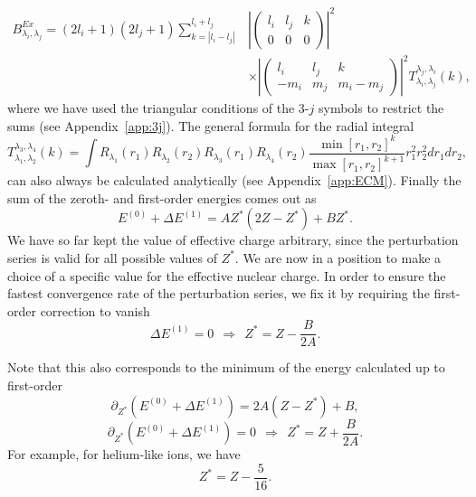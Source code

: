 \begin{align}
    B^{Ex}_{\lambda_i,\lambda_j} = (2l_i+1)(2l_j+1)\sum_{k=|l_i-l_j|}^{l_i+l_j}&
    \left| \begin{pmatrix} l_i & l_j & k \\ 0 & 0 & 0\end{pmatrix}\right|^2 \nonumber
\\& \times
    \left|\begin{pmatrix} l_i & l_j & k \\ -m_i & m_j & m_i-m_j \end{pmatrix}\right|^2
T^{\lambda_j,\lambda_i}_{\lambda_i,\lambda_j}(k),
\end{align}
where we have used the triangular conditions of the 3-$j$ symbols to restrict the sums (see Appendix~\ref{app:3j}). The general formula for the radial integral
\begin{equation}
    T^{\lambda_3,\lambda_4}_{\lambda_1,\lambda_2}(k) = \int R_{\lambda_1}(r_1) R_{\lambda_2}(r_2) R_{\lambda_3}(r_1) R_{\lambda_4}(r_2) \frac{\min[r_1,r_2]^k}{\max[r_1,r_2]^{k+1}} r_1^2 r_2^2 dr_1 dr_2,
\end{equation}
can also always be calculated analytically (see Appendix~\ref{app:ECM}).
Finally the sum of the zeroth- and first-order energies comes out as
\begin{equation} \label{Z-Z}
E^{(0)} + \Delta E^{(1)} = A Z^*(2Z-Z^*)+B Z^*.
\end{equation}
We have so far kept the value of effective charge arbitrary, since the perturbation series is valid for all possible values of $Z^*$. We are now in a position to make a choice of a specific value for the effective nuclear charge. In order to ensure the fastest convergence rate of the perturbation series, we fix it by
requiring the first-order correction to vanish
\begin{equation} \label{Z-Z}
\Delta E^{(1)} = 0 ~~\Rightarrow~~Z^* = Z - \frac{B}{2A} .
\end{equation}

Note that this also corresponds to the minimum of the energy calculated up to first-order
\begin{equation} \label{Z-Z}
\partial_{Z^*} (E^{(0)} + \Delta E^{(1)}) = 2A(Z-Z^*)+B,
\end{equation}
\begin{equation} \label{Z-Z}
\partial_{Z^*} (E^{(0)} + \Delta E^{(1)}) = 0 ~~\Rightarrow~~Z^* = Z + \frac{B}{2A} .
\end{equation}
For example, for helium-like ions, we have
\begin{equation}
    Z^* = Z-\frac{5}{16}.
\end{equation}

